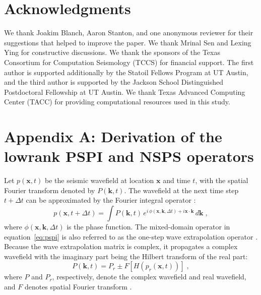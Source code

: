 \section{Acknowledgments}
We thank Joakim Blanch, Aaron Stanton, and one anonymous reviewer for their suggestions that helped to improve the paper. We thank Mrinal Sen and Lexing Ying for constructive discussions. We thank the sponsors of the Texas Consortium for Computation Seismology (TCCS) for financial support. The first author is supported additionally by the Statoil Fellows Program at UT Austin, and the third author is supported by the Jackson School Distinguished Postdoctoral Fellowship at UT Austin. We thank Texas Advanced Computing Center (TACC) for providing computational resources used in this study.

\section{Appendix A: Derivation of the lowrank PSPI and NSPS operators}
\label{sec:adjoint}

Let $p(\mathbf{x},t)$ be the seismic wavefield at location $\mathbf{x}$ and time $t$, with the spatial Fourier transform denoted by $P(\mathbf{k},t)$. The wavefield at the next time step $t+ \Delta t$ can be approximated by the Fourier integral operator \cite[]{wards,lowrank}:
\begin{equation}
  \label{eq:pspi}
  p(\mathbf{x},t+\Delta t) = \int P(\mathbf{k},t)\,e^{i\,\phi(\mathbf{x},\mathbf{k},\Delta t) + i\mathbf{x} \cdot \mathbf{k}}\,d\mathbf{k}\;,
\end{equation}
where $\phi(\mathbf{x},\mathbf{k},\Delta t)$ is the phase function.
The mixed-domain operator in equation~\ref{eq:pspi} is also referred to as the one-step wave extrapolation operator \cite[]{zhang09,me13}. Because the wave extrapolation matrix is complex, it propagates a complex wavefield with the imaginary part being the Hilbert transform of the real part:
 \begin{equation}
  \label{eq:hilb}
P(\mathbf{k},t)=P_r \pm F[H(p_r(\mathbf{x},t))]\;,
\end{equation}
where $P$ and $P_r$, respectively, denote the complex wavefield and real wavefield, and $F$ denotes spatial Fourier transform \cite[]{zhang09}.

